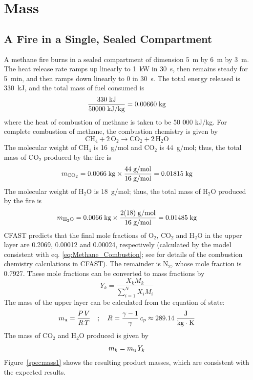 \clearpage


\section{Mass}
\label{mass_conservation}
\label{mass_balance}

\subsection{A Fire in a Single, Sealed Compartment}
\label{sec:spec1}
\label{species_mass_1}

A methane fire burns in a sealed compartment of dimension 5~m by 6~m by 3~m. The heat release rate ramps up linearly to 1~kW in 30~s, then remains steady for 5~min, and then ramps down linearly to 0 in 30~s. The total energy released is 330~kJ, and the total mass of fuel consumed is
\begin{equation}
  \frac{ 330 \; {\rm kJ} }{ 50000 \; {\rm kJ/kg} } = 0.00660 \; {\rm kg}
\end{equation}
where the heat of combustion of methane is taken to be 50 000 kJ/kg. For complete combustion of methane, the combustion chemistry is given by
\begin{equation}
   \mathrm{CH_4 + 2 \, O_2 \to CO_2 + 2 \, H_2O}
   \label{eq:Methane_Combustion}
\end{equation}
The molecular weight of CH$_4$ is 16~g/mol and CO$_2$ is 44~g/mol; thus, the total mass of CO$_2$ produced by the fire is
\begin{equation}
   m_{\rm CO_2} = 0.0066 \; {\rm kg} \times  \frac{ 44 \; {\rm g/mol} }{ 16 \; {\rm g/mol} } = 0.01815 \; {\rm kg}
\end{equation}
The molecular weight of H$_2$O is 18~g/mol; thus, the total mass of H$_2$O produced by the fire is
\begin{equation}
   m_{\rm H_2O} = 0.0066 \; {\rm kg} \times  \frac{ 2(18) \; {\rm g/mol} }{ 16 \; {\rm g/mol} } = 0.01485 \; {\rm kg}
\end{equation}
CFAST predicts that the final mole fractions of O$_2$, CO$_2$ and H$_2$O in the upper layer are 0.2069, 0.00012 and 0.00024, respectively (calculated by the model consistent with eq. \ref{eq:Methane_Combustion}; see \cite{CFAST_Tech_Guide_7} for details of the combustion chemistry calculations in CFAST). The remainder is N$_2$, whose mole fraction is 0.7927. These mole fractions can be converted to mass fractions by
\begin{equation}
Y_k = \frac{X_{k} M_{k}}{\sum_{i=1}^N X_{i}M_{i}}
\end{equation}
The mass of the upper layer can be calculated from the equation of state:
\begin{equation}
m_{\rm u} = \frac{P \, V}{R \, T} \quad ; \quad R = \frac{\gamma-1}{\gamma} \, c_p \approx 289.14 \; {\rm  \frac{J}{kg \cdot K}}
\end{equation}
The mass of CO$_2$ and H$_2$O produced is given by
\begin{equation}
m_{k} = m_{\rm u} \, Y_{k}
\end{equation}
Figure~\ref{specmass1} shows the resulting product masses, which are consistent with the expected results.

